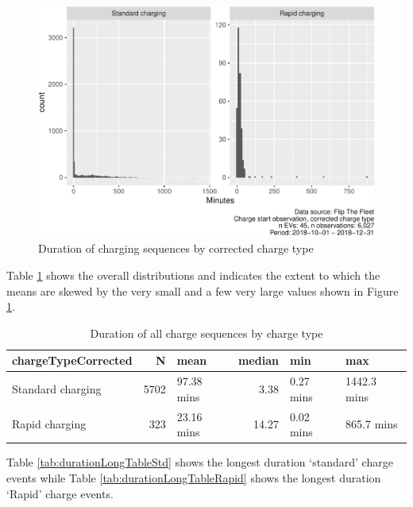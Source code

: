 \documentclass[]{article}
\begin{document}
\begin{figure}
\centering
\includegraphics{EVBB_report_v1_files/figure-latex/durationHist-1.pdf}
\caption{\label{fig:durationHist}Duration of charging sequences by corrected charge type}
\end{figure}

Table \ref{tab:durationDescTable} shows the overall distributions and indicates the extent to which the means are skewed by the very small and a few very large values shown in Figure \ref{fig:durationHist}.

\begin{table}[t]

\caption{\label{tab:durationDescTable}Duration of all charge sequences by charge type}
\centering
\begin{tabular}{l|r|l|r|l|l}
\hline
chargeTypeCorrected & N & mean & median & min & max\\
\hline
Standard charging & 5702 & 97.38 mins & 3.38 & 0.27 mins & 1442.3 mins\\
\hline
Rapid charging & 323 & 23.16 mins & 14.27 & 0.02 mins & 865.7 mins\\
\hline
\end{tabular}
\end{table}

Table \ref{tab:durationLongTableStd} shows the longest duration `standard' charge events while Table \ref{tab:durationLongTableRapid} shows the longest duration `Rapid' charge events.
\end{document}
